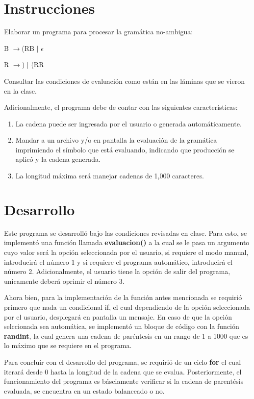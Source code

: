 \documentclass{article}
\begin{document}
	\section*{Instrucciones}
	Elaborar un programa para procesar la gramática no-ambigua:
	
	B $\rightarrow$(RB $\mid$ $\epsilon$
	
	R $\rightarrow$) $\mid$ (RR
		
	
	Consultar las condiciones de evaluación como están en las láminas que se vieron en la clase.
		
	Adicionalmente, el programa debe de contar con las siguientes características:
	
	\begin{enumerate}
		\item La cadena puede ser ingresada por el usuario o generada automáticamente.
		\item Mandar a un archivo y/o en pantalla la evaluación de la gramática imprimiendo el símbolo que está evaluando, indicando que producción se aplicó y la cadena generada.
		\item La longitud máxima será manejar cadenas de 1,000 caracteres.
		
	\end{enumerate}
	\section*{Desarrollo}
	Este programa se desarrolló bajo las condiciones revisadas en clase. Para esto, se implementó una función llamada \textbf{evaluacion()} a la cual se le pasa un argumento cuyo valor será la opción seleccionada por el usuario, si requiere el modo manual, introducirá el número 1 y si requiere el programa automático, introducirá el número 2. Adicionalmente, el usuario tiene la opción de salir del programa, unicamente deberá oprimir el número 3.
	
	Ahora bien, para la implementación de la función antes mencionada se requirió primero que nada un condicional if, el cual dependiendo de la opción seleccionada por el usuario, desplegará en pantalla un mensaje. En caso de que la opción selccionada sea automática, se implementó un bloque de código con la función \textbf{randint}, la cual genera una cadena de paréntesis en un rango de 1 a 1000 que es lo máximo que se requiere en el programa. 
	
	Para concluir con el desarrollo del programa, se requirió de un ciclo \textbf{for} el cual iterará desde 0 hasta la longitud de la cadena que se evalua. Posteriormente, el funcionamiento del programa es básciamente verificar si la cadena de parentésis evaluada, se encuentra en un estado balanceado o no.
	 
\end{document}
